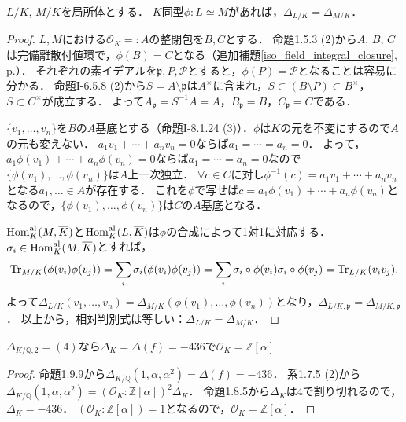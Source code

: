 \begin{screen}
  \begin{lem}
    \label{LF_iso_relative_disc}
    $L/K$, $M/K$を局所体とする．
    $K$同型$\phi\colon L\simeq M$があれば，$\varDelta_{L/K} = \varDelta_{M/K}$．
  \end{lem}
\end{screen}
\begin{proof}
  $L, M$における$\mathcal{O}_K =: A$の整閉包を$B, C$とする．
  命題1.5.3 (2)から$A$, $B$, $C$は完備離散付値環で，$\phi(B)=C$となる（追加補題\ref{iso_field_integral_closure}, p.\pageref{iso_field_integral_closure}）．
  それぞれの素イデアルを$\mathfrak{p}, P, \mathcal{P}$とすると，$\phi(P)=\mathcal{P}$となることは容易に分かる．
  命題I-6.5.8 (2)から$S=A\setminus\mathfrak{p}$は$A^\times$に含まれ，$S \subset (B \setminus P) \subset B^\times$，$S\subset C^\times$が成立する．
  よって$A_\mathfrak{p} = S^{-1}A = A$，$B_\mathfrak{p} = B$，$C_\mathfrak{p} = C$である．

  $\{v_1, \ldots, v_n\}$を$B$の$A$基底とする（命題I-8.1.24 (3)）．$\phi$は$K$の元を不変にするので$A$の元も変えない．
  $a_1v_1+\cdots+a_nv_n=0$ならば$a_1=\cdots=a_n=0$．
  よって，$a_1\phi(v_1)+\cdots+a_n\phi(v_n)=0$ならば$a_1=\cdots=a_n=0$なので$\{\phi(v_1), \ldots, \phi(v_n)\}$は$A$上一次独立．
  $\forall c\in C$に対し$\phi^{-1}(c)=a_1v_1+\cdots+a_nv_n$となる$a_1, \ldots\in A$が存在する．
  これを$\phi$で写せば$c=a_1\phi(v_1)+\cdots+a_n\phi(v_n)$となるので，$\{\phi(v_1), \ldots, \phi(v_n)\}$は$C$の$A$基底となる．

  $\operatorname{Hom}_K^\text{al}(M, \overline{K})$と$\operatorname{Hom}_K^\text{al}(L, \overline{K})$は$\phi$の合成によって1対1に対応する．
  $\sigma_i \in \operatorname{Hom}_K^\text{al}(M, \overline{K})$とすれば，
  \[\operatorname{Tr}_{M/K}(\phi(v_i)\phi(v_j))=\sum_i\sigma_i(\phi(v_i)\phi(v_j))=\sum_i\sigma_i\circ\phi(v_i)\sigma_i\circ\phi(v_j)=\operatorname{Tr}_{L/K}(v_iv_j).\]
  よって$\varDelta_{L/K}(v_1, \ldots, v_n)=\varDelta_{M/K}(\phi(v_1), \ldots, \phi(v_n))$となり，$\varDelta_{L/K, \mathfrak{p}}=\varDelta_{M/K, \mathfrak{p}}$．
  以上から，相対判別式は等しい：$\varDelta_{L/K}=\varDelta_{M/K}$．
\end{proof}

\begin{screen}
  $\varDelta_{K/\mathbb{Q}, 2}=(4)$なら$\varDelta_K=\varDelta(f)=-436$で$\mathcal{O}_K = \mathbb{Z}[\alpha]$
\end{screen}
\begin{proof}
  命題1.9.9から$\varDelta_{K/\mathbb{Q}}(1, \alpha, \alpha^2) = \varDelta(f) = -436$．
  系1.7.5 (2)から$\varDelta_{K/\mathbb{Q}}(1, \alpha, \alpha^2) = (\mathcal{O}_K:\mathbb{Z}[\alpha])^2\varDelta_K$．
  命題1.8.5から$\varDelta_K$は$4$で割り切れるので，$\varDelta_K = -436$．
  $(\mathcal{O}_K:\mathbb{Z}[\alpha]) = 1$となるので，$\mathcal{O}_K = \mathbb{Z}[\alpha]$．
\end{proof}

